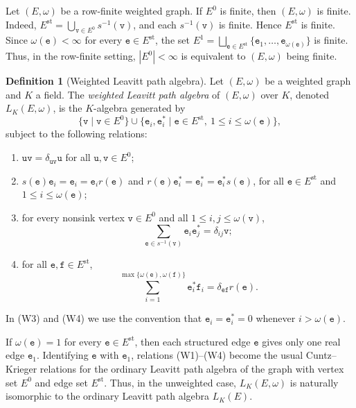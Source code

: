 \documentclass{article}
\theoremstyle{definition}
\newtheorem{definition}{Definition}
\begin{document}
Let $(E,\omega)$ be a row-finite weighted graph. If $E^0$ is finite, then $(E,\omega)$ is finite. Indeed, $E^{\mathrm{st}}=\bigcup_{\mathtt{v}\in E^0}s^{-1}(\mathtt{v})$, and each $s^{-1}(\mathtt{v})$ is finite. Hence $E^{\mathrm{st}}$ is finite. Since $\omega(\mathtt{e})<\infty$ for every $\mathtt{e}\in E^{\mathrm{st}}$, the set $E^1=\bigsqcup_{\mathtt{e}\in E^{\mathrm{st}}}\{\mathtt{e}_1,\ldots,\mathtt{e}_{\omega(\mathtt{e})}\}$ is finite. Thus, in the row-finite setting, $|E^0|<\infty$ is equivalent to $(E,\omega)$ being finite.

\begin{definition}[Weighted Leavitt path algebra]
Let $(E,\omega)$ be a weighted graph and $K$ a field. The \emph{weighted Leavitt path algebra} of $(E,\omega)$ over $K$, denoted $L_K(E,\omega)$, is the $K$-algebra generated by
$$
\{\mathtt{v}\mid \mathtt{v}\in E^0\}\cup
\{\mathtt{e}_i,\mathtt{e}_i^*\mid \mathtt{e}\in E^{\mathrm{st}},\ 1\leq i\leq \omega(\mathtt{e})\},
$$
subject to the following relations:
\begin{enumerate}[label=\textup{(W\arabic*)}]
\item $\mathtt{u}\mathtt{v}=\delta_{\mathtt{u}\mathtt{v}}\mathtt{u}$ for all $\mathtt{u},\mathtt{v}\in E^0$;
\item $s(\mathtt{e})\mathtt{e}_i=\mathtt{e}_i=\mathtt{e}_i r(\mathtt{e})$ and $r(\mathtt{e})\mathtt{e}_i^*=\mathtt{e}_i^*=\mathtt{e}_i^*s(\mathtt{e})$, for all $\mathtt{e}\in E^{\mathrm{st}}$ and $1\leq i\leq\omega(\mathtt{e})$;
\item for every nonsink vertex $\mathtt{v}\in E^0$ and all $1\leq i,j\leq\omega(\mathtt{v})$,
$$
\sum_{\mathtt{e}\in s^{-1}(\mathtt{v})}\mathtt{e}_i\mathtt{e}_j^*=\delta_{ij}\mathtt{v};
$$
\item for all $\mathtt{e},\mathtt{f}\in E^{\mathrm{st}}$,
$$
\sum_{i=1}^{\max\{\omega(\mathtt{e}),\omega(\mathtt{f})\}}\mathtt{e}_i^*\mathtt{f}_i
=\delta_{\mathtt{e}\mathtt{f}}r(\mathtt{e}).
$$
\end{enumerate}
In \textup{(W3)} and \textup{(W4)} we use the convention that $\mathtt{e}_i=\mathtt{e}_i^*=0$ whenever $i>\omega(\mathtt{e})$.
\end{definition}

If $\omega(\mathtt{e})=1$ for every $\mathtt{e}\in E^{\mathrm{st}}$, then each structured edge $\mathtt{e}$ gives only one real edge $\mathtt{e}_1$. Identifying $\mathtt{e}$ with $\mathtt{e}_1$, relations \textup{(W1)}--\textup{(W4)} become the usual Cuntz--Krieger relations for the ordinary Leavitt path algebra of the graph with vertex set $E^0$ and edge set $E^{\mathrm{st}}$. Thus, in the unweighted case, $L_K(E,\omega)$ is naturally isomorphic to the ordinary Leavitt path algebra $L_K(E)$.
\end{document}
